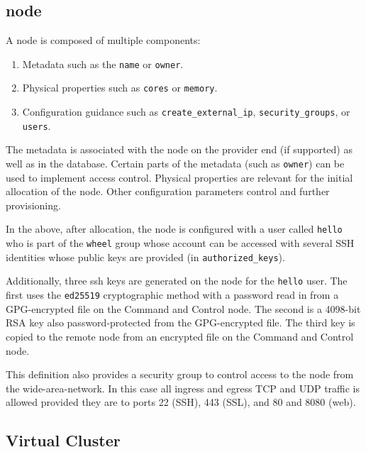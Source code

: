 \documentclass[9pt,twocolumn,twoside]{styles/osajnl}
\begin{document}


\subsection{node}

A node is composed of multiple components:

\begin{enumerate}
\item Metadata such as the \verb|name| or \verb|owner|.
\item Physical properties such as \verb|cores| or \verb|memory|.
\item Configuration guidance such as \verb|create_external_ip|,
  \verb|security_groups|, or \verb|users|.
\end{enumerate}

The metadata is associated with the node on the provider end (if
supported) as well as in the database. Certain parts of the metadata
(such as \verb|owner|) can be used to implement access
control. Physical properties are relevant for the initial allocation
of the node. Other configuration parameters control and further
provisioning.

In the above, after allocation, the node is configured with a user
called \verb|hello| who is part of the \verb|wheel| group whose
account can be accessed with several SSH identities whose public keys
are provided (in \verb|authorized_keys|).

Additionally, three ssh keys are generated on the node for the
\verb|hello| user. The first uses the \verb|ed25519| cryptographic
method with a password read in from a GPG-encrypted file on the
Command and Control node. The second is a 4098-bit RSA key also
password-protected from the GPG-encrypted file. The third key is
copied to the remote node from an encrypted file on the Command and
Control node.

This definition also provides a security group to control access to
the node from the wide-area-network. In this case all ingress and
egress TCP and UDP traffic is allowed provided they are to ports 22
(SSH), 443 (SSL), and 80 and 8080 (web).





\subsection{Virtual Cluster}
\end{document}
